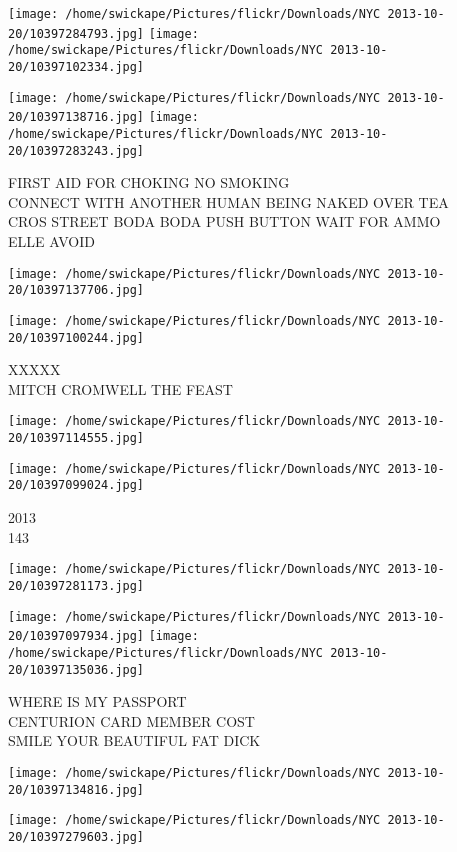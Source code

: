 \documentclass[10pt,letterpaper]{article}
\begin{document}
\texttt{[image: /home/swickape/Pictures/flickr/Downloads/NYC 2013-10-20/10397284793.jpg]}
\texttt{[image: /home/swickape/Pictures/flickr/Downloads/NYC 2013-10-20/10397102334.jpg]}

\texttt{[image: /home/swickape/Pictures/flickr/Downloads/NYC 2013-10-20/10397138716.jpg]}
\texttt{[image: /home/swickape/Pictures/flickr/Downloads/NYC 2013-10-20/10397283243.jpg]}

FIRST AID FOR CHOKING NO SMOKING\\
CONNECT WITH ANOTHER HUMAN BEING NAKED OVER TEA\\
CROS STREET BODA BODA PUSH BUTTON WAIT FOR AMMO\\
ELLE AVOID
\pagebreak

\texttt{[image: /home/swickape/Pictures/flickr/Downloads/NYC 2013-10-20/10397137706.jpg]}

\vspace{0.25in}
\texttt{[image: /home/swickape/Pictures/flickr/Downloads/NYC 2013-10-20/10397100244.jpg]}

XXXXX\\
MITCH CROMWELL THE FEAST
\pagebreak

\texttt{[image: /home/swickape/Pictures/flickr/Downloads/NYC 2013-10-20/10397114555.jpg]}

\vspace{0.25in}
\texttt{[image: /home/swickape/Pictures/flickr/Downloads/NYC 2013-10-20/10397099024.jpg]}

2013\\
143
\pagebreak

\texttt{[image: /home/swickape/Pictures/flickr/Downloads/NYC 2013-10-20/10397281173.jpg]}

\vspace{0.25in}
\texttt{[image: /home/swickape/Pictures/flickr/Downloads/NYC 2013-10-20/10397097934.jpg]}
\texttt{[image: /home/swickape/Pictures/flickr/Downloads/NYC 2013-10-20/10397135036.jpg]}

WHERE IS MY PASSPORT\\
CENTURION CARD MEMBER COST\\
SMILE YOUR BEAUTIFUL FAT DICK
\pagebreak

\texttt{[image: /home/swickape/Pictures/flickr/Downloads/NYC 2013-10-20/10397134816.jpg]}

\vspace{0.25in}
\texttt{[image: /home/swickape/Pictures/flickr/Downloads/NYC 2013-10-20/10397279603.jpg]}
\end{document}
